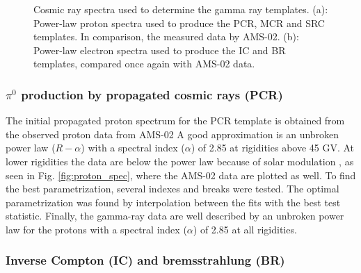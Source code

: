 \begin{figure}[h]
\begin{minipage}[h]{0.45\textwidth}
	  \subcaption{}
	  \label{fig:electron_spec}
  \end{minipage}
  \caption{Cosmic ray spectra used to determine the gamma ray templates. (a): Power-law proton spectra used to produce the PCR, MCR and SRC templates. In comparison, the measured data by AMS-02. (b): Power-law electron spectra used to produce the IC and BR templates, compared once again with AMS-02 data.}
  \label{fig:cosmic_ray_spec}
\end{figure}



\subsubsection{$\pi^0$ production by propagated cosmic rays (PCR)}

The initial propagated proton spectrum for the PCR template is obtained from the observed proton data from AMS-02 %
A good approximation is an unbroken power law ($R-\alpha$) with a spectral index ($\alpha$) of 2.85 at rigidities above 45 GV. At lower rigidities the data are below the power law because of solar modulation %
, as seen in Fig. \ref{fig:proton_spec}, where the AMS-02 data are plotted as well. To find the best parametrization, several indexes and breaks were tested. The optimal parametrization was found by interpolation between the fits with the best test statistic.
Finally, the gamma-ray data are well described by an unbroken power law for the protons with a spectral index ($\alpha$) of 2.85 at all rigidities.\\



\subsubsection{Inverse Compton (IC) and bremsstrahlung (BR)}


